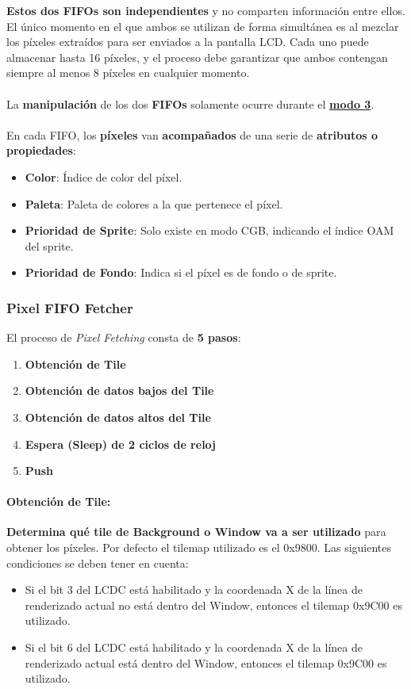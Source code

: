 \textbf{Estos dos FIFOs son independientes} y no comparten información entre ellos. El único momento en el que ambos se utilizan de forma simultánea es al mezclar los píxeles extraídos para ser enviados a la pantalla LCD. Cada uno puede almacenar hasta 16 píxeles, y el proceso debe garantizar que ambos contengan siempre al menos 8 píxeles en cualquier momento.
\\\\
La \textbf{manipulación} de los dos \textbf{FIFOs} solamente ocurre durante el \textbf{\hyperref[ppu:mode3]{modo 3}}.
\\\\
En cada FIFO, los \textbf{píxeles} van \textbf{acompañados} de una serie de \textbf{atributos o propiedades}:
\begin{itemize}
    \item \textbf{Color}: Índice de color del píxel.
    \item \textbf{Paleta}: Paleta de colores a la que pertenece el píxel.
    \item \textbf{Prioridad de Sprite}: Solo existe en modo CGB, indicando el índice OAM del sprite.
    \item \textbf{Prioridad de Fondo}: Indica si el píxel es de fondo o de sprite.
\end{itemize}

\subsubsection{Pixel FIFO Fetcher}

El proceso de \textit{Pixel Fetching} consta de \textbf{5 pasos}:

\begin{enumerate}
    \item \textbf{Obtención de Tile}
    \item \textbf{Obtención de datos bajos del Tile}
    \item \textbf{Obtención de datos altos del Tile}
    \item \textbf{Espera (Sleep) de 2 ciclos de reloj}
    \item \textbf{Push}
\end{enumerate}

\paragraph{Obtención de Tile:} \textbf{Determina qué tile de Background o Window va a ser utilizado} para obtener los píxeles. Por defecto el tilemap utilizado es el 0x9800. Las siguientes condiciones se deben tener en cuenta:
\begin{itemize}
    \item Si el bit 3 del LCDC está habilitado y la coordenada X de la línea de renderizado actual no está dentro del Window, entonces el tilemap 0x9C00 es utilizado.
    \item Si el bit 6 del LCDC está habilitado y la coordenada X de la línea de renderizado actual está dentro del Window, entonces el tilemap 0x9C00 es utilizado.
\end{itemize}

